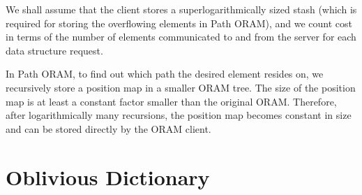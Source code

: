 \documentclass[11pt]{article}
\begin{document}
We shall assume that the client stores a superlogarithmically sized
stash (which is required for storing the overflowing elements in Path ORAM), 
and we count cost in terms of the number of elements 
communicated 
to and from the server for each data structure request.

In Path ORAM, to find out which path the desired element 
resides on, we recursively store a position map 
in  a smaller ORAM tree. 
The size of the position map is at least a constant factor
smaller than the original ORAM. Therefore, after logarithmically
many recursions, the position map becomes constant in size
and can be stored directly by the ORAM client.






\section{Oblivious Dictionary}
\end{document}
